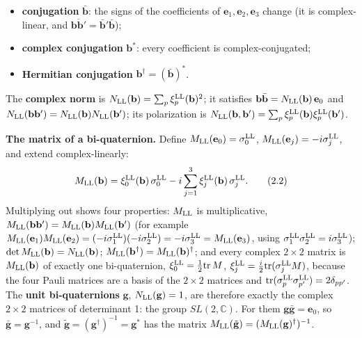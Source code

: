 \documentclass[
  10pt,
]{article}
\providecommand{\tightlist}{%
  \setlength{\itemsep}{0pt}\setlength{\parskip}{0pt}}
\begin{document}
\begin{itemize}
\tightlist
\item
  \textbf{conjugation} \(\bar{\mathbf b}\): the signs of the
  coefficients of \(\mathbf e_1,\mathbf e_2,\mathbf e_3\) change (it is
  complex-linear, and
  \(\overline{\mathbf b\mathbf b'}=\bar{\mathbf b}'\bar{\mathbf b}\));
\item
  \textbf{complex conjugation} \(\mathbf b^*\): every coefficient is
  complex-conjugated;
\item
  \textbf{Hermitian conjugation}
  \(\mathbf b^\dagger=(\bar{\mathbf b})^*\).
\end{itemize}

The \textbf{complex norm} is
\(N_{\rm LL}(\mathbf b)=\sum_p\xi^{\rm LL}_p(\mathbf b)^2\); it
satisfies
\(\mathbf b\bar{\mathbf b}=N_{\rm LL}(\mathbf b)\,\mathbf e_0\) and
\(N_{\rm LL}(\mathbf b\mathbf b')=N_{\rm LL}(\mathbf b)N_{\rm LL}(\mathbf b')\);
its polarization is
\(N_{\rm LL}(\mathbf b,\mathbf b')=\sum_p\xi^{\rm LL}_p(\mathbf b)\xi^{\rm LL}_p(\mathbf b')\).

\textbf{The matrix of a bi-quaternion.} Define
\(M_{\rm LL}(\mathbf e_0)=\sigma^{\rm LL}_0\),
\(M_{\rm LL}(\mathbf e_j)=-i\sigma^{\rm LL}_j\), and extend
complex-linearly:
\[M_{\rm LL}(\mathbf b)=\xi^{\rm LL}_0(\mathbf b)\,\sigma^{\rm LL}_0-i\sum_{j=1}^3\xi^{\rm LL}_j(\mathbf b)\,\sigma^{\rm LL}_j.\tag{2.2}\]
Multiplying out shows four properties: \(M_{\rm LL}\) is multiplicative,
\(M_{\rm LL}(\mathbf b\mathbf b')=M_{\rm LL}(\mathbf b)M_{\rm LL}(\mathbf b')\)
(for example
\(M_{\rm LL}(\mathbf e_1)M_{\rm LL}(\mathbf e_2)=(-i\sigma^{\rm LL}_1)(-i\sigma^{\rm LL}_2)=-i\sigma^{\rm LL}_3=M_{\rm LL}(\mathbf e_3)\),
using \(\sigma^{\rm LL}_1\sigma^{\rm LL}_2=i\sigma^{\rm LL}_3\));
\(\det M_{\rm LL}(\mathbf b)=N_{\rm LL}(\mathbf b)\);
\(M_{\rm LL}(\mathbf b^\dagger)=M_{\rm LL}(\mathbf b)^\dagger\); and
every complex \(2\times2\) matrix is \(M_{\rm LL}(\mathbf b)\) of
exactly one bi-quaternion, \(\xi^{\rm LL}_0=\tfrac12\mathrm{tr}\,M\),
\(\xi^{\rm LL}_j=\tfrac i2\mathrm{tr}(\sigma^{\rm LL}_jM)\), because the
four Pauli matrices are a basis of the \(2\times2\) matrices and
\(\mathrm{tr}(\sigma^{\rm LL}_p\sigma^{\rm LL}_{p'})=2\delta_{pp'}\).
The \textbf{unit bi-quaternions} \(\mathbf g\),
\(N_{\rm LL}(\mathbf g)=1\), are therefore exactly the complex
\(2\times2\) matrices of determinant 1: the group \(SL(2,\mathbb C)\).
For them \(\mathbf g\bar{\mathbf g}=\mathbf e_0\), so
\(\bar{\mathbf g}=\mathbf g^{-1}\), and
\(\tilde{\mathbf g}=(\mathbf g^\dagger)^{-1}=\mathbf g^*\) has the
matrix
\(M_{\rm LL}(\tilde{\mathbf g})=(M_{\rm LL}(\mathbf g)^\dagger)^{-1}\).
\end{document}
